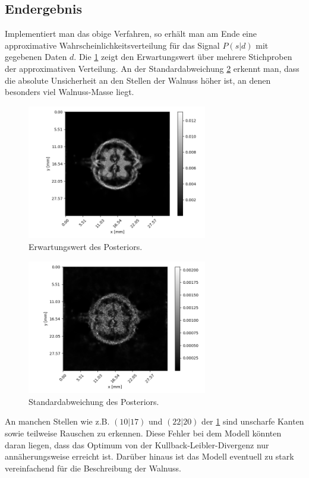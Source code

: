 \subsection{Endergebnis}

Implementiert man das obige Verfahren, so erhält man am Ende eine approximative Wahrscheinlichkeitsverteilung für das Signal $P(s|d)$ mit gegebenen Daten $d$. Die \cref{k4.2.fig.ct.mean} zeigt den Erwartungswert über mehrere Stichproben der approximativen Verteilung. An der Standardabweichung \cref{k4.2.fig.ct.std} erkennt man, dass die absolute Unsicherheit an den Stellen der Walnuss höher ist, an denen besonders viel Walnuss-Masse liegt. 

\begin{figure}[htb]
  \centering
  \includegraphics[width=0.7\textwidth]{k4.2/ct-walnuss-mean.png}
  \caption{Erwartungswert des Posteriors.}
  \label{k4.2.fig.ct.mean}
\end{figure}

\begin{figure}[htb]
  \centering
  \includegraphics[width=0.7\textwidth]{k4.2/ct-walnuss-std.png}
  \caption{Standardabweichung des Posteriors.}
  \label{k4.2.fig.ct.std}
\end{figure}

An manchen Stellen wie z.B. $(10|17)$ und $(22|20)$ der \cref{k4.2.fig.ct.mean} sind unscharfe Kanten sowie teilweise Rauschen zu erkennen. Diese Fehler bei dem Modell könnten daran liegen, dass das Optimum von der Kullback-Leibler-Divergenz nur annäherungsweise erreicht ist. Darüber hinaus ist das Modell eventuell zu stark vereinfachend für die Beschreibung der Walnuss. 

